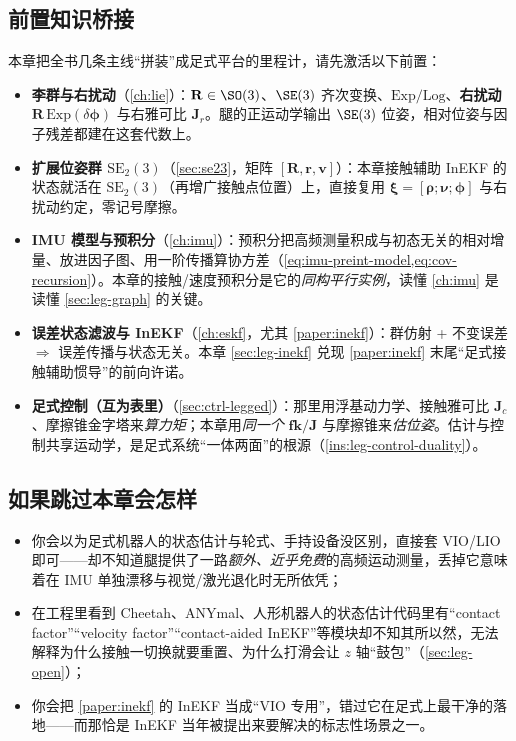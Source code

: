 \subsection*{前置知识桥接}
本章把全书几条主线“拼装”成足式平台的里程计，请先激活以下前置：
\begin{itemize}
  \item \textbf{李群与右扰动}（\cref{ch:lie}）：$\mathbf{R}\in\SO(3)$、$\SE(3)$ 齐次变换、$\mathrm{Exp}/\mathrm{Log}$、\textbf{右扰动} $\mathbf{R}\,\mathrm{Exp}(\delta\boldsymbol{\phi})$ 与右雅可比 $\mathbf{J}_r$。腿的正运动学输出 $\SE(3)$ 位姿，相对位姿与因子残差都建在这套代数上。
  \item \textbf{扩展位姿群 $\mathrm{SE}_2(3)$}（\cref{sec:se23}，矩阵 $[\mathbf{R},\mathbf{r},\mathbf{v}]$）：本章接触辅助 InEKF 的状态就活在 $\mathrm{SE}_2(3)$（再增广接触点位置）上，直接复用 $\boldsymbol{\xi}=[\boldsymbol{\rho};\boldsymbol{\nu};\boldsymbol{\phi}]$ 与右扰动约定，零记号摩擦。
  \item \textbf{IMU 模型与预积分}（\cref{ch:imu}）：预积分把高频测量积成与初态无关的相对增量、放进因子图、用一阶传播算协方差（\cref{eq:imu-preint-model,eq:cov-recursion}）。本章的接触/速度预积分是它的\emph{同构平行实例}，读懂 \cref{ch:imu} 是读懂 \cref{sec:leg-graph} 的关键。
  \item \textbf{误差状态滤波与 InEKF}（\cref{ch:eskf}，尤其 \cref{paper:inekf}）：群仿射 + 不变误差 $\Rightarrow$ 误差传播与状态无关。本章 \cref{sec:leg-inekf} 兑现 \cref{paper:inekf} 末尾“足式接触辅助惯导”的前向许诺。
  \item \textbf{足式控制（互为表里）}（\cref{sec:ctrl-legged}）：那里用浮基动力学、接触雅可比 $\mathbf{J}_c$、摩擦锥金字塔来\emph{算力矩}；本章用\emph{同一个} $\mathbf{fk}/\mathbf{J}$ 与摩擦锥来\emph{估位姿}。估计与控制共享运动学，是足式系统“一体两面”的根源（\cref{ins:leg-control-duality}）。
\end{itemize}

\subsection*{如果跳过本章会怎样}
\begin{itemize}
  \item 你会以为足式机器人的状态估计与轮式、手持设备没区别，直接套 VIO/LIO 即可——却不知道腿提供了一路\emph{额外、近乎免费}的高频运动测量，丢掉它意味着在 IMU 单独漂移与视觉/激光退化时无所依凭；
  \item 在工程里看到 Cheetah、ANYmal、人形机器人的状态估计代码里有“contact factor”“velocity factor”“contact-aided InEKF”等模块却不知其所以然，无法解释为什么接触一切换就要重置、为什么打滑会让 $z$ 轴“鼓包”（\cref{sec:leg-open}）；
  \item 你会把 \cref{paper:inekf} 的 InEKF 当成“VIO 专用”，错过它在足式上最干净的落地——而那恰是 InEKF 当年被提出来要解决的标志性场景之一\cite{hartley2020contact}。
\end{itemize}

